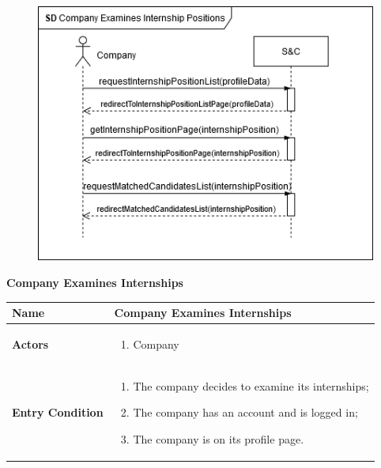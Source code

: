 \begin{enumerate}[label=\textbf{[US\arabic*]}, left = 0pt, align = left, resume]
            \newpage
            \begin{figure}[h!]
                \centering
                    \includegraphics[width=1\textwidth]{RASD/Images/UseCases/US11_CompanyExaminesInternshipPositions.drawio.png}
                \label{fig:example}
            \end{figure}
            \newpage     

            \newpage
            \item \textbf{Company Examines Internships} 
            
            \begin{longtable}{|l|p{11cm}|}  
                \hline
                \textbf{Name} & 
                    \textbf{Company Examines Internships} \\
                \hline
                
                \textbf{Actors} & 
                    \begin{enumerate}[label=\textbullet, itemsep=0em]
                        \item Company
                    \end{enumerate} \\
                \hline
                
                \textbf{Entry Condition} & 
                    \begin{enumerate}[label=\textbullet, itemsep=0em]
                        \item The company decides to examine its internships;
                        \item The company has an account and is logged in;
                        \item The company is on its profile page.
                    \end{enumerate} \\
                \hline
                

\end{longtable}
\end{enumerate}
